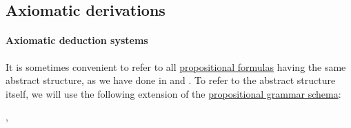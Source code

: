 \subsection{Axiomatic derivations}\label{subsec:axiomatic_derivations}

\paragraph{Axiomatic deduction systems}

\begin{definition}\label{def:propositional_formula_schema}\mimprovised
  It is sometimes convenient to refer to all \hyperref[def:propositional_syntax/formula]{propositional formulas} having the same abstract structure, as we have done in  and . To refer to the abstract structure itself, we will use the following extension of the \hyperref[def:propositional_syntax]{propositional grammar schema}:
  \begin{bnf*}
      {}, \\
             {\bnftsq{\( \syntop \)} \bnfor \bnftsq{\( \synbot \)} \bnfor} \\
     \\
     \\
  \end{bnf*}
\end{definition}
